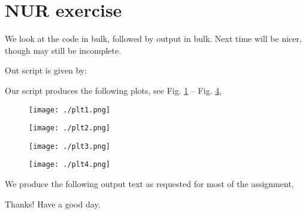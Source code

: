 \section{NUR exercise}

We look at the code in bulk, followed by output in bulk. Next time will be nicer, though may still be incomplete.

Out script is given by:


Our script produces the following plots, see Fig. \ref{fig:plt1} -- Fig. \ref{fig:plt4},


\begin{figure}[h!]
  \centering
  \texttt{[image: ./plt1.png]}
  \caption{}
  \label{fig:plt1}
\end{figure}

\begin{figure}[h!]
  \centering
  \texttt{[image: ./plt2.png]}
  \caption{}
  \label{fig:plt2}
\end{figure}

\begin{figure}[h!]
  \centering
  \texttt{[image: ./plt3.png]}
  \caption{}
  \label{fig:plt3}
\end{figure}

\begin{figure}[h!]
  \centering
  \texttt{[image: ./plt4.png]}
  \caption{}
  \label{fig:plt4}
\end{figure}

We produce the following output text as requested for most of the assignment,



Thanks! Have a good day.
